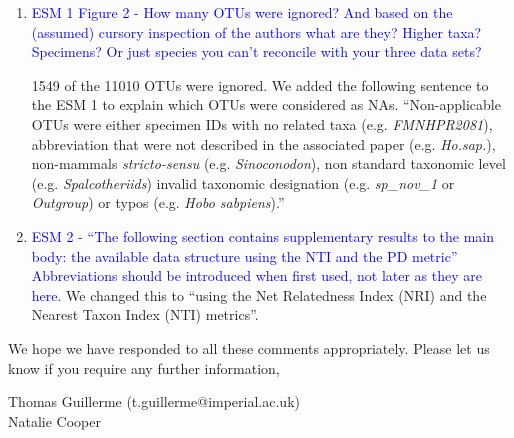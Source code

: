 \documentclass[12pt,letterpaper]{article}
\begin{document}
\begin{enumerate}
\item{\textcolor{blue}{ESM 1 Figure 2 - How many OTUs were ignored? And based on the (assumed) cursory inspection of the authors what are they? Higher taxa? Specimens? Or just species you can't reconcile with your three data sets?}}

1549 of the 11010 OTUs were ignored.
We added the following sentence to the ESM 1 to explain which OTUs were considered as NAs.
``Non-applicable OTUs were either specimen IDs with no related taxa (e.g. \textit{FMNHPR2081}), abbreviation that were not described in the associated paper (e.g. \textit{Ho.sap.}), non-mammals \textit{stricto-sensu} (e.g. \textit{Sinoconodon}), non standard taxonomic level (e.g. \textit{Spalcotheriids}) invalid taxonomic designation (e.g. \textit{sp\_nov\_1} or \textit{Outgroup}) or typos (e.g. \textit{Hobo sabpiens}).''

\item{\textcolor{blue}{ESM 2 - ``The following section contains supplementary results to the main body: the available data structure using the NTI and the PD metric'' Abbreviations should be introduced when first used, not later as they are here.}}
We changed this to ``using the Net Relatedness Index (NRI) and the Nearest Taxon Index (NTI) metrics''.

\end{enumerate}



We hope we have responded to all these comments appropriately. Please let us know if you require any further information,\\
\bigskip





Thomas Guillerme (t.guillerme@imperial.ac.uk)\\
Natalie Cooper
\end{document}

